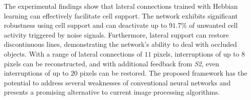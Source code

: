 The experimental findings show that lateral connections trained with Hebbian learning can effectively facilitate cell support.
The network exhibits significant robustness using cell support and can deactivate up to $91.7\%$ of unwanted cell activity triggered by noise signals. Furthermore, lateral support can restore discontinuous lines, demonstrating the network's ability to deal with occluded objects. With a range of lateral connections of $11$ pixels, interruptions of up to $8$ pixels can be reconstructed, and with additional feedback from \emph{S2}, even interruptions of up to $20$ pixels can be restored. The proposed framework has the potential to address several weaknesses of conventional neural networks and presents a promising alternative to current image processing algorithms.